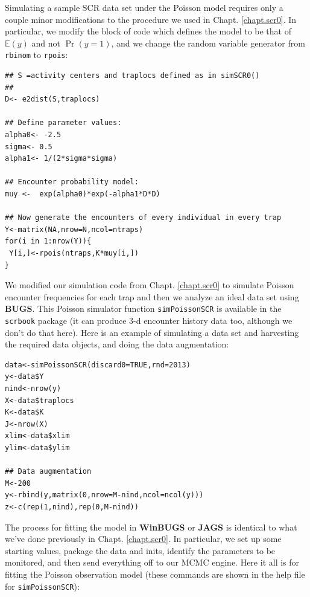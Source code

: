 Simulating a sample SCR data set under the Poisson model requires only
a couple minor modifications to the procedure we used in
Chapt. \ref{chapt.scr0}. In particular, we modify the block of code
which defines the model to be that of $\mathbb{E}(y)$ and not $\Pr(y=1)$, and
we change the random variable generator from \mbox{\tt rbinom} to
\mbox{\tt rpois}:
{\small
\begin{verbatim}
## S =activity centers and traplocs defined as in simSCR0()
##
D<- e2dist(S,traplocs)

## Define parameter values:
alpha0<- -2.5
sigma<- 0.5
alpha1<- 1/(2*sigma*sigma)

## Encounter probability model:
muy <-  exp(alpha0)*exp(-alpha1*D*D)

## Now generate the encounters of every individual in every trap
Y<-matrix(NA,nrow=N,ncol=ntraps)
for(i in 1:nrow(Y)){
 Y[i,]<-rpois(ntraps,K*muy[i,])
}
\end{verbatim}
}

We modified our simulation code from Chapt. \ref{chapt.scr0} to
simulate Poisson encounter frequencies for each trap and then we
analyze an ideal data set using {\bf BUGS}. This Poisson simulator
function {\tt simPoissonSCR} is available in the \mbox{\tt scrbook}
package (it can produce 3-d encounter history data too, although we
don't do that here).  Here is an example of simulating a data set and
harvesting the required data objects, and doing the data augmentation:

{\small
\begin{verbatim}
data<-simPoissonSCR(discard0=TRUE,rnd=2013)
y<-data$Y
nind<-nrow(y)
X<-data$traplocs
K<-data$K
J<-nrow(X)
xlim<-data$xlim
ylim<-data$ylim

## Data augmentation 
M<-200
y<-rbind(y,matrix(0,nrow=M-nind,ncol=ncol(y)))
z<-c(rep(1,nind),rep(0,M-nind))
\end{verbatim}
}

The process for fitting
the model in {\bf WinBUGS} or {\bf JAGS} is identical to what we've done
previously in Chapt. \ref{chapt.scr0}. In particular, we set up some
starting values, package the data and inits, identify the parameters
to be monitored, and then send everything off to our MCMC engine. Here
it all is for fitting the Poisson observation model (these commands
are shown in the help file for \mbox{\tt simPoissonSCR}):

